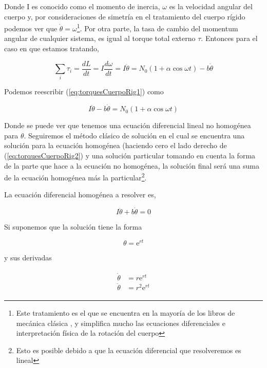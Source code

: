 \documentclass[a4paper,10pt]{article}
\numberwithin{equation}{section}
\newcommand{\euler}{\mathrm{e}}
\begin{document}
Donde I es conocido como el momento de inercia, $\omega$ es la velocidad angular
del cuerpo y, por consideraciones de simetría en el tratamiento del cuerpo
rígido podemos ver que $\dot{\theta} = \omega$\footnote{Este tratamiento es el que
se encuentra en la mayoría de los libros de mecánica clásica \cite{marion,arya}, y simplifica mucho
las ecuaciones diferenciales e interpretación física de la rotación del cuerpo}. Por
otra parte, la tasa de cambio del momentum angular de cualquier sistema, es igual
al torque total externo $\tau$. Entonces para el caso en que estamos tratando,

\begin{equation}
 \sum_i \tau_i = \frac{dL}{dt} = I \frac{d\omega}{dt} = I \ddot{\theta} 
 = N_0(1+\alpha \cos{\omega t}) - b\dot{\theta}
 \label{eq:torquesCuerpoRig1}
\end{equation}

Podemos reescribir (\ref{eq:torquesCuerpoRig1}) como

\begin{equation}
 I\ddot{\theta} - b\dot{\theta} = N_0(1+\alpha \cos{\omega t})
 \label{eq:torquesCuerpoRig2}
\end{equation}

Donde se puede ver que tenemos una ecuación diferencial lineal no homogénea
para $\theta$. Seguiremos el método clásico de solución en el cual se encuentra
una solución para la ecuación homogénea (haciendo cero el lado derecho de
(\ref{eq:torquesCuerpoRig2}) y una solución particular tomando en cuenta 
la forma de la parte que hace a la ecuación no homogénea, la solución final 
será una suma de la ecuación homogénea más la particular\footnote{Esto es posible
debido a que la ecuación diferencial que resolveremos es lineal}.

\vspace{.3cm}

La ecuación diferencial homogénea a resolver es,

\begin{equation}
 I\ddot{\theta} + b\dot{\theta} = 0
 \label{eq:helixHomog1}
\end{equation}

Si suponemos que la solución tiene la forma 

$$\theta = \euler^{rt}$$

y sus derivadas

\begin{align*}
 \begin{split}
%  
  \dot{\theta} &= r\euler^{rt} \\
  \ddot{\theta} &= r^2\euler^{rt}  
%
 \end{split}
\end{align*}
\end{document}
